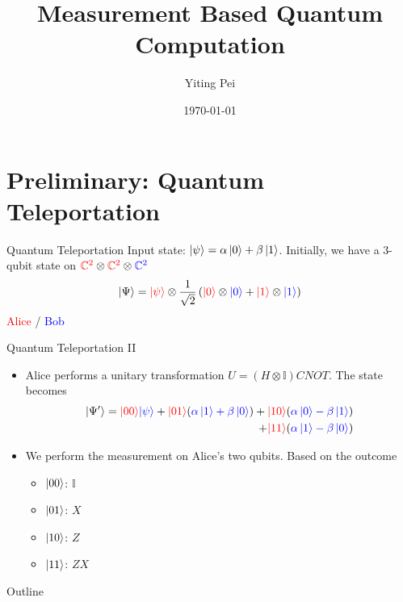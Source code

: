 \documentclass{beamer}
\title[Your Short Title]{Measurement Based Quantum Computation}
\author{Yiting Pei}
\date{\today}
\begin{document}
\begin{frame}
  \titlepage
\end{frame}

\section{Preliminary: Quantum Teleportation}
\begin{frame}{Quantum Teleportation}
Input state: $\ket{\psi} = \alpha \ket{0} + \beta \ket{1}$. Initially, we have a 3-qubit state on $\textcolor{red}{\mathbb{C}^2}\otimes\textcolor{red}{\mathbb{C}^2}\otimes\textcolor{blue}{\mathbb{C}^2}$
\begin{align*}
    \ket{\Psi} = \textcolor{red}{\ket{\psi}} \otimes \frac{1}{\sqrt{2}} \left(\textcolor{red}{\ket{0}} \otimes \textcolor{blue}{\ket{0}} + \textcolor{red}{\ket{1}} \otimes \textcolor{blue}{\ket{1}}\right)
\end{align*}
\textcolor{red}{Alice} / \textcolor{blue}{Bob}
\end{frame}

\begin{frame}{Quantum Teleportation II}
    \begin{itemize}
        \item Alice performs a unitary transformation $U = (H \otimes \mathbb{I})CNOT$. The state becomes
        \begin{align*}
            \ket{\Psi'} = \textcolor{red}{\ket{00}}\textcolor{blue}{\ket{\psi}} + \textcolor{red}{\ket{01}}(\textcolor{blue}{\alpha\ket{1} + \beta\ket{0}}) + \textcolor{red}{\ket{10}}(\textcolor{blue}{\alpha\ket{0} - \beta\ket{1}}) \\+ \textcolor{red}{\ket{11}}(\textcolor{blue}{\alpha\ket{1} - \beta\ket{0}})
        \end{align*}
        \item We perform the measurement on Alice's two qubits. Based on the outcome
        \begin{itemize}
            \item $\ket{00}$: $\mathbb{I}$
            \item $\ket{01}$: $X$
            \item $\ket{10}$: $Z$
            \item $\ket{11}$: $ZX$
        \end{itemize}
    \end{itemize}
\end{frame}

\begin{frame}{Outline}
 \tableofcontents
\end{frame}
\end{document}
